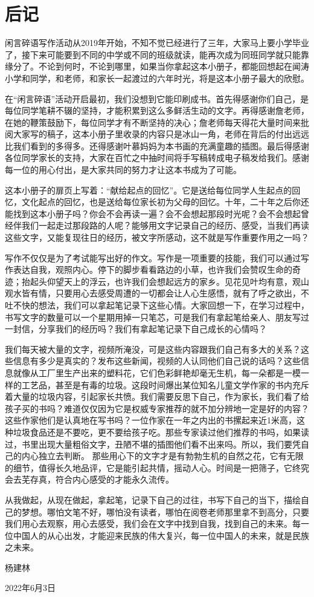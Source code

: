 \chapter{后记}

闲言碎语写作活动从2019年开始，不知不觉已经进行了三年，大家马上要小学毕业了，接下来可能要到不同的中学或不同的班级就读，能再次成为同班同学就只能靠缘分了。不论到何时，不论到哪里，如果当你拿起这本小册子，都能回想起在闻涛小学和同学，和老师，和家长一起渡过的六年时光，将是这本小册子最大的欣慰。

在“闲言碎语”活动开启最初，我们没想到它能印刷成书。首先得感谢你们自己，是每位同学笔耕不辍的坚持，才能积累到这么多鲜活生动的文字。再得感谢詹老师，在她的鞭策鼓励下，每位同学才有不断坚持的决心；詹老师每天得花大量时间来批阅大家写的稿子，这本小册子里收录的内容只是冰山一角，老师在背后的付出远远比我们看到的多得多。还得感谢叶慕妈妈为本书画的充满童趣的插图。最后得感谢各位同学家长的支持，大家在百忙之中抽时间将手写稿转成电子稿发给我们。感谢每一位的用心付出，是大家共同的努力才让这本书成为了可能。

这本小册子的扉页上写着：“献给起点的回忆”。它是送给每位同学人生起点的回忆，文化起点的回忆，也是送给每位家长初为父母的回忆。十年，二十年之后你还能找到这本小册子吗？你会不会再读一遍？会不会想起那段时光呢？会不会想起曾经伴我们一起走过那段路的人呢？能够用文字记录自己的经历、感受，当我们再读这些文字，又能复现往日的经历，被文字所感动，这不就是写作重要作用之一吗？

写作不仅仅是为了考试能写出好的作文。写作是一项重要的技能，我们可以通过写作表达自我，观照内心。停下的脚步看看路边的小草，也许我们会赞叹生命的奇迹；抬起头仰望天上的浮云，也许我们会想起远方的家乡。见花见叶均有意，观山观水皆有情，只要用心去感受周遭的一切都会让人心生感悟，就有了呼之欲出，不吐不快的想法，我们可以拿起笔记录下这些心情。大家回想一下，在学习过程中，书写文字的数量可以一个星期用掉一只笔芯，可是我们有拿起笔给亲人、朋友写过一封信，分享我们的经历吗？我们有拿起笔记录下自己成长的心情吗？

我们每天被大量的文字，视频所淹没，可是这些内容跟我们自己有多大的关系？这些信息有多少是真实的？发布这些新闻，视频的人认同他们自己说的话吗？这些信息就像从工厂里生产出来的塑料花，它们色彩鲜艳却毫无生机，每一朵都是一模一样的工艺品，甚至是有毒的垃圾。这段时间爆出某位知名儿童文学作家的书内充斥着大量的垃圾内容，引起家长共愤。我们需要反思下自己，作为家长，我们看了给孩子买的书吗？难道仅仅因为它是权威专家推荐的就不加分辨地一定是好的内容？这些作家他们是认真地在写书吗？一位作家在一年之内出的书摞起来近1米高，这种垃圾食品还是不要吃，更不要给孩子吃。那些专家读过他们推荐的书吗，如果读过，书里出现大量粗俗文字，丑陋不堪的插图他们看不出来吗。所以，我们要凭自己的内心独立去判断。
那些用心下的文字才是有勃勃生机的自然之花，它有无限的细节，值得长久地品评，它是能引起共情，摇动人心。时间是一把筛子，它终究会去芜存真，符合内心感受的才能永久流传。

从我做起，从现在做起，拿起笔，记录下自己的过往，书写下自己的当下，描绘自己的梦想。哪怕文笔不好，哪怕没有读者，哪怕在阅卷老师那里拿不到高分，只要我们用心去观察，用心去感受，我们会在文字中找到自我，找到自己的未来。每一位中国人的从心出发，才能迎来民族的伟大复兴，每一位中国人的未来，就是民族之未来。

\vspace{5em}

杨建林

2022年6月3日